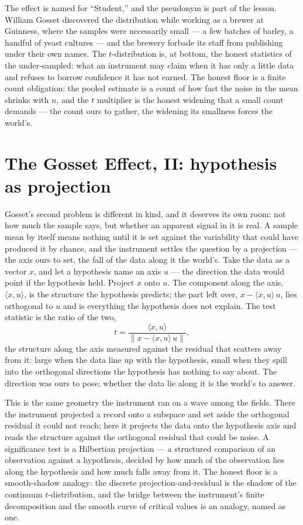 The effect is named for ``Student,'' and the pseudonym is part of the lesson. William Gosset discovered the
distribution while working as a brewer at Guinness, where the samples were necessarily small --- a few batches
of barley, a handful of yeast cultures --- and the brewery forbade its staff from publishing under their own
names. The $t$-distribution is, at bottom, the honest statistics of the under-sampled: what an instrument may
claim when it has only a little data and refuses to borrow confidence it has not earned. The honest floor is a
finite count obligation: the pooled estimate is a count of how fast the noise in the mean shrinks with $n$,
and the $t$ multiplier is the honest widening that a small count demands --- the count ours to gather, the widening
its smallness forces the world's.

\section{The Gosset Effect, II: hypothesis as projection}
\label{se:gosset-projection}

Gosset's second problem is different in kind, and it deserves its own room: not how much the sample says, but
whether an apparent signal in it is real. A sample mean by itself means nothing until it is set against the
variability that could have produced it by chance, and the instrument settles the question by a projection ---
the axis ours to set, the fall of the data along it the world's.
Take the data as a vector $x$, and let a hypothesis name an axis $u$ --- the direction the data would point if
the hypothesis held. Project $x$ onto $u$. The component along the axis, $\langle x, u\rangle$, is the
structure the hypothesis predicts; the part left over, $x - \langle x, u\rangle\,u$, lies orthogonal to $u$
and is everything the hypothesis does not explain. The test statistic is the ratio of the two,
\begin{equation}
  t = \frac{\langle x, u\rangle}{\lVert x - \langle x, u\rangle\, u\rVert},
\end{equation}
the structure along the axis measured against the residual that scatters away from it: large when the data
line up with the hypothesis, small when they spill into the orthogonal directions the hypothesis has nothing
to say about. The direction was ours to pose; whether the data lie along it is the world's to answer.

This is the same geometry the instrument ran on a wave among the fields. There the instrument projected a record onto a
subspace and set aside the orthogonal residual it could not reach; here it projects the data onto the
hypothesis axis and reads the structure against the orthogonal residual that could be noise. A significance
test is a Hilbertian projection --- a structured comparison of an observation against a hypothesis, decided by
how much of the observation lies along the hypothesis and how much falls away from it. The honest floor is a
smooth-shadow analogy: the discrete projection-and-residual is the shadow of the continuum $t$-distribution,
and the bridge between the instrument's finite decomposition and the smooth curve of critical values is an
analogy, named as one.

